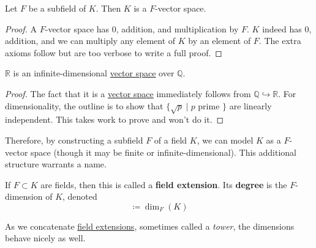   \begin{theorem}
    \label{thm:fields_vector_space}
    Let $F$ be a subfield of $K$. Then $K$ is a $F$-vector space. 
  \end{theorem}
  \begin{proof}
    A $F$-vector space has $0$, addition, and multiplication by $F$. $K$ indeed has $0$, addition, and we can multiply any element of $K$ by an element of $F$. The extra axioms follow but are too verbose to write a full proof. 
  \end{proof}

  \begin{corollary}
    \label{thm:r-is-infinite-dimensional-over-q}
 
    $\mathbb{R}$ is an infinite-dimensional \hyperref[def:vector-space]{vector space} over $\mathbb{Q}$. 
  \end{corollary}
  \begin{proof}
    The fact that it is a \hyperref[def:vector-space]{vector space} immediately follows from $\mathbb{Q} \hookrightarrow \mathbb{R}$. For dimensionality, the outline is to show that $\{\sqrt{p} \mid p \text{ prime }\}$ are linearly independent. This takes work to prove and won't do it. 
  \end{proof}

  Therefore, by constructing a subfield $F$ of a field $K$, we can model $K$ as a $F$-vector space (though it may be finite or infinite-dimensional). This additional structure warrants a name. 

  \begin{definition}
    \label{def:field-extension}
    If $F \subset K$ are fields, then this is called a \textbf{field extension}. Its \textbf{degree} is the $F$-dimension of $K$, denoted
    \begin{equation}
      [K:F] \coloneqq \dim_F (K) 
    \end{equation}
  \end{definition} 

  As we concatenate \hyperref[def:field-extension]{field extensions}, sometimes called a \textit{tower}, the dimensions behave nicely as well. 

